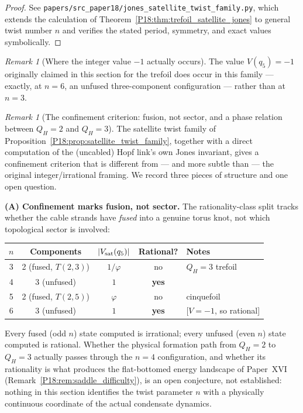 \documentclass[11pt,a4paper]{article}
\theoremstyle{definition}\newtheorem{definition}[theorem]{Definition}
\theoremstyle{remark}
\newtheorem{remark}[theorem]{Remark}
\newcommand{\vp}{\varphi}
\newcommand{\QH}{Q_H}
\newcommand{\Jones}{V}
\begin{document}
\begin{proof}
See \texttt{papers/src\_paper18/jones\_satellite\_twist\_family.py},
which extends the calculation of
Theorem~\ref{P18:thm:trefoil_satellite_jones} to general twist number $n$
and verifies the stated period, symmetry, and exact values
symbolically.
\end{proof}

\begin{remark}[Where the integer value $-1$ actually occurs]
\label{P18:rem:minus_one_at_n6}
The value $\Jones(q_5)=-1$ originally claimed in this section for the
trefoil does occur in this family --- exactly, at $n=6$, an unfused
three-component configuration --- rather than at $n=3$.
\end{remark}

\begin{remark}[The confinement criterion: fusion, not sector, and a phase relation between $\QH=2$ and $\QH=3$]
\label{P18:rem:richer_criterion}
The satellite twist family of Proposition~\ref{P18:prop:satellite_twist_family},
together with a direct computation of the (uncabled) Hopf link's own
Jones invariant, gives a confinement criterion that is different
from --- and more subtle than --- the original integer/irrational
framing.  We record three pieces of structure and one open question.

\textbf{(A) Confinement marks fusion, not sector.}
The rationality-class split tracks whether the cable strands
have \emph{fused} into a genuine torus knot, not which topological
sector is involved:
\begin{center}
\renewcommand{\arraystretch}{1.3}
\begin{tabular}{ccccl}
\toprule
$n$ & Components & $|\Jones_{\rm sat}(q_5)|$ & Rational? & Notes \\
\midrule
3 & 2 (fused, $T(2,3)$) & $1/\vp$ & no & $\QH=3$ trefoil \\
4 & 3 (unfused)          & $1$ & \textbf{yes} & \\
5 & 2 (fused, $T(2,5)$) & $\vp$ & no & cinquefoil \\
6 & 3 (unfused)          & $1$ & \textbf{yes} & [$V=-1$, so rational] \\
\bottomrule
\end{tabular}
\end{center}
Every fused (odd $n$) state computed is irrational; every unfused
(even $n$) state computed is rational.  Whether the physical
formation path from $\QH=2$ to $\QH=3$ actually passes through the
$n=4$ configuration, and whether its rationality is what produces the
flat-bottomed energy landscape of Paper~XVI~\cite{Paper16}
(Remark~\ref{P18:rem:saddle_difficulty}), is an open conjecture, not
established: nothing in this section identifies the twist parameter
$n$ with a physically continuous coordinate of the actual
condensate dynamics.


\end{remark}
\end{document}
